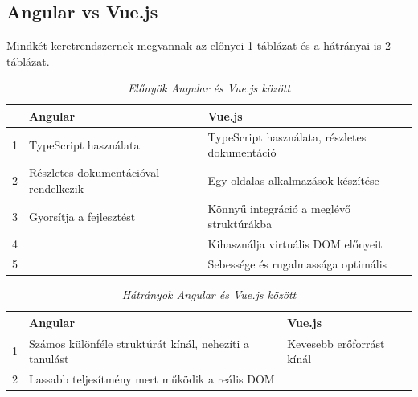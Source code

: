 \subsection{Angular vs Vue.js}
Mindkét keretrendszernek megvannak az előnyei \ref{tab:table1} táblázat és a hátrányai is \ref{tab:table2} táblázat. 
\begin{table}[H]
	\begin{footnotesize}
		\begin{center}
			\caption[Előnyök Angular és Vue.js között]{\textit{Előnyök Angular és Vue.js között \cite{vuevsang}}}
			\label{tab:table1}
			\begin{tabular}{p{0.5cm}|p{6cm}|p{6cm}}
				\textbf & \textbf{Angular} & \textbf{Vue.js}\\
				\hline
				1 & TypeScript használata & TypeScript használata, részletes dokumentáció\\
				\hline
				2 & Részletes dokumentációval rendelkezik & Egy oldalas alkalmazások készítése \\
				\hline
				3 & Gyorsítja a fejlesztést & Könnyű integráció a meglévő struktúrákba \\
				\hline
				4 & & Kihasználja virtuális DOM előnyeit \\
				\hline
				5 & & Sebessége és rugalmassága optimális \\
			\end{tabular}
		\end{center}
	\end{footnotesize}
\end{table}
\begin{table}[H]
	\begin{footnotesize}
		\begin{center}
			\caption[Hátrányok Angular és Vue.js között]{\textit{Hátrányok Angular és Vue.js között \cite{vuevsang}}}
			\label{tab:table2}
			\begin{tabular}{p{0.5cm}|p{6cm}|p{6cm}} 
				\textbf & \textbf{Angular} & \textbf{Vue.js}\\
				\hline
				1 & Számos különféle struktúrát kínál, nehezíti a tanulást & Kevesebb erőforrást kínál\\
				\hline
				2 & Lassabb teljesítmény mert működik a reális DOM &  \\
			\end{tabular}
		\end{center}
	\end{footnotesize}
\end{table}

